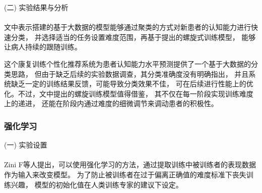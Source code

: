 \documentclass[12pt]{article}
\begin{document}
            


            (二) 实验结果与分析\paragraph{}
            文中表示搭建的基于大数据的模型能够通过聚类的方式对新患者的认知能力进行快速分类，
            并选择适当的任务设置难度范围，再基于提出的螺旋式训练模型，
            能够让病人持续的跟随训练。

            这个康复训练个性化推荐系统为患者认知能力水平预测提供了一个基于大数据的分类思路，
            但由于缺乏后续的实验数据调查，其分类准确度没有明确指出，
            并且系统缺乏一定的训练结果反馈，可能导致分类效果不佳，
            可在后续进行性能上的优化。不过，文中提出的螺旋训练模型值得借鉴，
            其不仅在每一阶段实现训练难度上的递进，
            还能在阶段内通过难度的细微调节来调动患者的积极性。






            \subsubsection{强化学习}
            (一) 实验设置\paragraph{}
            Zini F\cite{ref14}等人提出，可以使用强化学习的方法，通过提取训练中被训练者的表现数据作为输入来改变模型。
            为了防止被训练者在过于偏离正确值的难度标准下丧失训练兴趣，
            模型的初始化值在人类训练专家的建议下设定。
\end{document}
